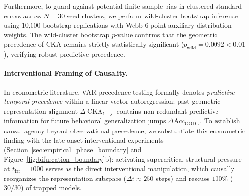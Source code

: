 \documentclass{article}
\theoremstyle{plain}
\theoremstyle{definition}
\DeclareMathOperator{\CKA}{CKA}
\begin{document}
Furthermore, to guard against potential finite-sample bias in clustered standard errors across $N=30$ seed clusters, we perform wild-cluster bootstrap inference \citep{Cameron2008Bootstrap} using 10,000 bootstrap replications with Webb 6-point auxiliary distribution weights. The wild-cluster bootstrap $p$-value confirms that the geometric precedence of CKA remains strictly statistically significant ($p_{\text{wild}} = 0.0092 < 0.01$), verifying robust predictive precedence.

\paragraph{Interventional Framing of Causality.}
In econometric literature, VAR precedence testing formally denotes \emph{predictive temporal precedence} within a linear vector autoregression: past geometric representation alignment $\Delta \CKA_{t-j}$ contains non-redundant predictive information for future behavioral generalization jumps $\Delta \text{Acc}_{\text{OOD}, t}$. To establish causal agency beyond observational precedence, we substantiate this econometric finding with the late-onset interventional experiments (Section~\ref{sec:empirical_phase_boundary} and Figure~\ref{fig:bifurcation_boundary}b): activating supercritical structural pressure at $t_{\text{int}} = 1000$ serves as the direct interventional manipulation, which causally reorganizes the representation subspace ($\Delta t \approx 250$ steps) and rescues $100\%$ ($30/30$) of trapped models.



\end{document}

